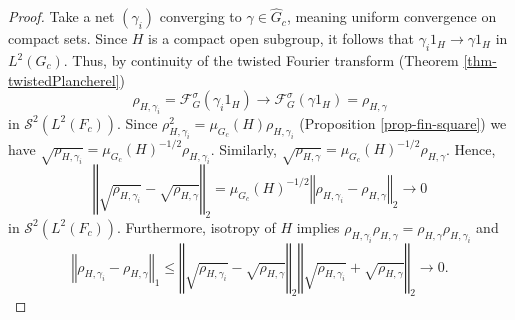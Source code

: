 \documentclass[12pt,reqno]{amsart}
\theoremstyle{definition}
\theoremstyle{definition}
\theoremstyle{definition}
\numberwithin{thm}{section}
\numberwithin{equation}{section}
\newcommand{\norm}[1]{\left\Vert#1\right\Vert}
\newcommand{\F}{\mathcal{F}}
\newcommand{\mc}[1]{\mathcal #1}
\newcommand{\wh}[1]{\widehat{#1}}
\begin{document}
\begin{proof} Take a net $(\gamma_i)$ converging to $\gamma\in\wh{G}_c$, meaning uniform convergence on compact sets. Since $H$ is a compact open subgroup, it follows that $\gamma_i1_H\rightarrow\gamma1_H$ in $L^2(G_c)$. Thus, by continuity of the twisted Fourier transform (Theorem \ref{thm-twistedPlancherel})
$$\rho_{H,\gamma_i}=\F^\sigma_G(\gamma_i1_H)\rightarrow\F^\sigma_G(\gamma1_H)=\rho_{H,\gamma}$$
in $\mc{S}^2(L^2(F_c))$. Since $\rho_{H,\gamma_i}^2=\mu_{G_c}(H)\rho_{H,\gamma_i}$ (Proposition \ref{prop-fin-square}) we have $\sqrt{\rho_{H,\gamma_i}}=\mu_{G_c}(H)^{-1/2}\rho_{H,\gamma_i}$. Similarly, $\sqrt{\rho_{H,\gamma}}=\mu_{G_c}(H)^{-1/2}\rho_{H,\gamma}$. Hence, $$\norm{\sqrt{\rho_{H,\gamma_i}}-\sqrt{\rho_{H,\gamma}}}_2=\mu_{G_c}(H)^{-1/2}\norm{\rho_{H,\gamma_i}-\rho_{H,\gamma}}_2\rightarrow 0$$ 
in $\mc{S}^2(L^2(F_c))$. Furthermore, isotropy of $H$ implies $\rho_{H,\gamma_i}\rho_{H,\gamma}=\rho_{H,\gamma}\rho_{H,\gamma_i}$ and
$$\norm{\rho_{H,\gamma_i}-\rho_{H,\gamma}}_1\leq\norm{\sqrt{\rho_{H,\gamma_i}}-\sqrt{\rho_{H,\gamma}}}_2\norm{\sqrt{\rho_{H,\gamma_i}}+\sqrt{\rho_{H,\gamma}}}_2\rightarrow 0.$$
\end{proof}
\end{document}
